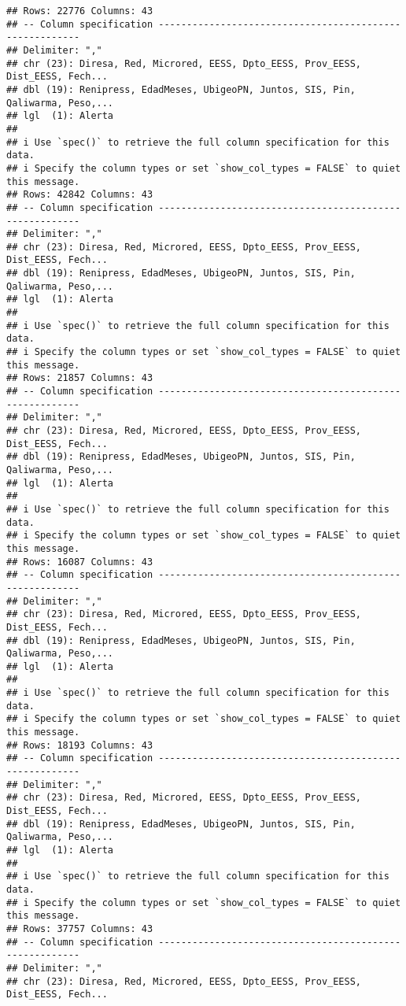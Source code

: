 \documentclass[
]{article}
\begin{document}
\begin{verbatim}
## Rows: 22776 Columns: 43
## -- Column specification --------------------------------------------------------
## Delimiter: ","
## chr (23): Diresa, Red, Microred, EESS, Dpto_EESS, Prov_EESS, Dist_EESS, Fech...
## dbl (19): Renipress, EdadMeses, UbigeoPN, Juntos, SIS, Pin, Qaliwarma, Peso,...
## lgl  (1): Alerta
## 
## i Use `spec()` to retrieve the full column specification for this data.
## i Specify the column types or set `show_col_types = FALSE` to quiet this message.
## Rows: 42842 Columns: 43
## -- Column specification --------------------------------------------------------
## Delimiter: ","
## chr (23): Diresa, Red, Microred, EESS, Dpto_EESS, Prov_EESS, Dist_EESS, Fech...
## dbl (19): Renipress, EdadMeses, UbigeoPN, Juntos, SIS, Pin, Qaliwarma, Peso,...
## lgl  (1): Alerta
## 
## i Use `spec()` to retrieve the full column specification for this data.
## i Specify the column types or set `show_col_types = FALSE` to quiet this message.
## Rows: 21857 Columns: 43
## -- Column specification --------------------------------------------------------
## Delimiter: ","
## chr (23): Diresa, Red, Microred, EESS, Dpto_EESS, Prov_EESS, Dist_EESS, Fech...
## dbl (19): Renipress, EdadMeses, UbigeoPN, Juntos, SIS, Pin, Qaliwarma, Peso,...
## lgl  (1): Alerta
## 
## i Use `spec()` to retrieve the full column specification for this data.
## i Specify the column types or set `show_col_types = FALSE` to quiet this message.
## Rows: 16087 Columns: 43
## -- Column specification --------------------------------------------------------
## Delimiter: ","
## chr (23): Diresa, Red, Microred, EESS, Dpto_EESS, Prov_EESS, Dist_EESS, Fech...
## dbl (19): Renipress, EdadMeses, UbigeoPN, Juntos, SIS, Pin, Qaliwarma, Peso,...
## lgl  (1): Alerta
## 
## i Use `spec()` to retrieve the full column specification for this data.
## i Specify the column types or set `show_col_types = FALSE` to quiet this message.
## Rows: 18193 Columns: 43
## -- Column specification --------------------------------------------------------
## Delimiter: ","
## chr (23): Diresa, Red, Microred, EESS, Dpto_EESS, Prov_EESS, Dist_EESS, Fech...
## dbl (19): Renipress, EdadMeses, UbigeoPN, Juntos, SIS, Pin, Qaliwarma, Peso,...
## lgl  (1): Alerta
## 
## i Use `spec()` to retrieve the full column specification for this data.
## i Specify the column types or set `show_col_types = FALSE` to quiet this message.
## Rows: 37757 Columns: 43
## -- Column specification --------------------------------------------------------
## Delimiter: ","
## chr (23): Diresa, Red, Microred, EESS, Dpto_EESS, Prov_EESS, Dist_EESS, Fech...

\end{verbatim}
\end{document}

